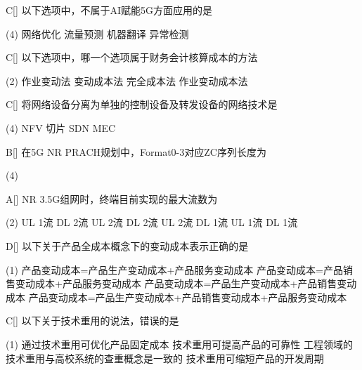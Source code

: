 \begin{choice}{C}[]
	以下选项中，不属于AI赋能5G方面应用的是
	\begin{tasks}(4)
		\task 网络优化
		\task 流量预测
		\task 机器翻译
		\task 异常检测
	\end{tasks}
\end{choice}

\begin{choice}{C}[]
	以下选项中，哪一个选项属于财务会计核算成本的方法
	\begin{tasks}(2)
		\task 作业变动法
		\task 变动成本法
		\task 完全成本法
		\task 作业变动成本法
	\end{tasks}
\end{choice}


\begin{choice}{C}[]
	将网络设备分离为单独的控制设备及转发设备的网络技术是
	\begin{tasks}(4)
		\task NFV
		\task 切片
		\task SDN
		\task MEC
	\end{tasks}
\end{choice}


\begin{choice}{B}[]
	在5G NR PRACH规划中，Format0-3对应ZC序列长度为
	\begin{tasks}(4)
	\end{tasks}
\end{choice}



\begin{choice}{A}[]
	NR 3.5G组网时，终端目前实现的最大流数为
	\begin{tasks}(2)
		\task UL 1流 DL 2流
		\task UL 2流 DL 2流
		\task UL 2流 DL 1流
		\task UL 1流 DL 1流
	\end{tasks}
\end{choice}


\begin{choice}{D}[]
	以下关于产品全成本概念下的变动成本表示正确的是
	\begin{tasks}(1)
		\task 产品变动成本=产品生产变动成本+产品服务变动成本
		\task 产品变动成本=产品销售变动成本+产品服务变动成本
		\task 产品变动成本=产品生产变动成本+产品销售变动成本
		\task 产品变动成本=产品生产变动成本+产品销售变动成本+产品服务变动成本
	\end{tasks}
\end{choice}


\begin{choice}{C}[]
	以下关于技术重用的说法，错误的是
	\begin{tasks}(1)
		\task 通过技术重用可优化产品固定成本
		\task  技术重用可提高产品的可靠性
		\task 工程领域的技术重用与高校系统的查重概念是一致的
		\task 技术重用可缩短产品的开发周期
	\end{tasks}
\end{choice}


